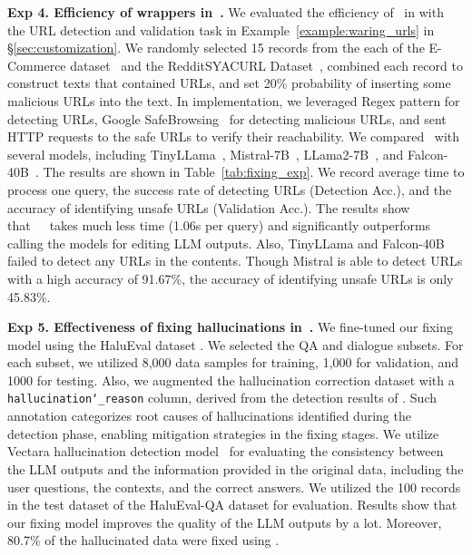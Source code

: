 \noindent\textbf{Exp 4. Efficiency of wrappers in~\customization. }
We evaluated the efficiency of \customization~in %
with the URL detection and validation task in Example~\ref{example:waring_urls} in \S\ref{sec:customization}. 
We randomly selected 15 records from the each of the E-Commerce dataset~\citep{e_commerce_dataset} and the RedditSYACURL Dataset~\citep{reddit-url-data}, combined each record to construct texts that contained URLs, and set 20\% probability of inserting some malicious URLs into the text. In implementation, we leveraged Regex pattern for detecting URLs, Google SafeBrowsing~\citep{google-safe-browsing} for detecting malicious URLs, and sent HTTP requests to the safe URLs to verify their reachability.
We compared \customization~with several models, including TinyLLama~\citep{zhang2024tinyllama}, Mistral-7B~\citep{jiang2023mistral}, LLama2-7B~\citep{touvron2023llama}, and Falcon-40B~\citep{falcon40b}. 
The results are shown in Table~\ref{tab:fixing_exp}. We record average time to process one query, the success rate of detecting URLs (Detection Acc.), and the accuracy of identifying unsafe URLs (Validation Acc.).
The results show that~\goodname~\customization~takes much less time (1.06s per query) and
significantly outperforms calling the models for editing LLM outputs. Also, TinyLLama and Falcon-40B failed to detect any URLs in the contents. Though Mistral is able to detect URLs with a high accuracy of 91.67\%, the accuracy of identifying unsafe URLs is only 45.83\%.


\noindent\textbf{Exp 5. Effectiveness of fixing hallucinations in~\fixing. } 
We fine-tuned our fixing model using the HaluEval dataset \cite{li2023halueval}. We selected the QA and dialogue subsets. For each subset, we utilized 8,000 data samples for training, 1,000 for validation, and 1000 for testing.  
Also, we augmented the hallucination correction dataset with a \texttt{hallucination\char`_reason} column, derived from the detection results of \detection. Such annotation categorizes root causes of hallucinations identified during the detection phase, enabling mitigation strategies in the fixing stages.
We utilize Vectara hallucination detection model~\citep{vectara_halu} for evaluating the consistency between the LLM outputs and the information provided in the original data, including the user questions, the contexts, and the correct answers. We utilized the 100 records in the test dataset of the HaluEval-QA dataset for evaluation. Results show that our fixing model improves the quality of the LLM outputs by a lot. Moreover, 80.7\% of the hallucinated data were fixed using \fixing.